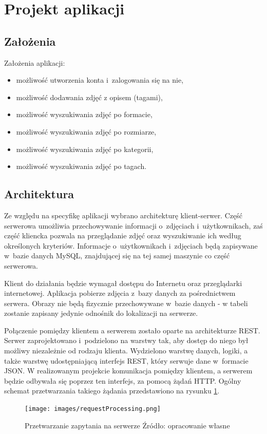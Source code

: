 \section{Projekt aplikacji}
\subsection{Założenia}
Założenia aplikacji:
\begin{itemize}
    \item możliwość utworzenia konta i~zalogowania się na nie,
	\item możliwość dodawania zdjęć z opisem (tagami),
    \item możliwość wyszukiwania zdjęć po formacie,
    \item możliwość wyszukiwania zdjęć po rozmiarze,
    \item możliwość wyszukiwania zdjęć po kategorii,
    \item możliwość wyszukiwania zdjęć po tagach.
\end{itemize}

\subsection{Architektura}
Ze względu na specyfikę aplikacji wybrano architekturę klient-serwer. Część serwerowa umożliwia przechowywanie informacji o~zdjęciach i~użytkownikach, zaś część kliencka pozwala na przeglądanie zdjęć oraz wyszukiwanie ich według określonych kryteriów. Informacje o~użytkownikach i~zdjęciach będą zapisywane w~bazie danych MySQL, znajdującej się na tej samej maszynie co część serwerowa. 

Klient do działania będzie wymagał dostępu do Internetu oraz przeglądarki internetowej. Aplikacja pobierze zdjęcia z~bazy danych za pośrednictwem serwera. Obrazy nie będą fizycznie przechowywane w~bazie danych - w tabeli zostanie zapisany jedynie odnośnik do lokalizacji na serwerze.

Połączenie pomiędzy klientem a serwerem zostało oparte
na architekturze REST.
Serwer zaprojektowano i~podzielono na warstwy tak, aby dostęp do niego był możliwy niezależnie od rodzaju klienta. Wydzielono warstwę danych, logiki, a także warstwę udostępniającą interfejs REST, który serwuje dane w~formacie JSON. W realizowanym projekcie komunikacja pomiędzy klientem, a serwerem będzie odbywała się poprzez ten interfejs, za pomocą żądań HTTP. Ogólny schemat przetwarzania takiego żądania przedstawiono na rysunku \ref{fig:requestProcessing}. 
\begin{figure}[ht]
	\centering
	\texttt{[image: images/requestProcessing.png]}
	\caption{Przetwarzanie zapytania na serwerze
		\newline Źródło: opracowanie własne}
	\label{fig:requestProcessing}
\end{figure}
